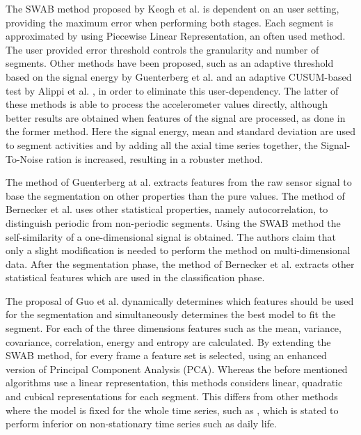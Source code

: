 The SWAB method proposed by Keogh et al. \cite{keogh2001online} is dependent on an user setting, providing the maximum error when performing both stages.
Each segment is approximated by using Piecewise Linear Representation, an often used method.
The user provided error threshold controls the granularity and number of segments.
Other methods have been proposed, such as an adaptive threshold based on the signal energy by Guenterberg et al. \cite{guenterberg2009automatic} and an adaptive CUSUM-based test by Alippi et al. \cite{alippi2006adaptive}, in order to eliminate this user-dependency.
The latter of these methods is able to process the accelerometer values directly, although better results are obtained when features of the signal are processed, as done in the former method.
Here the signal energy, mean and standard deviation are used to segment activities and by adding all the axial time series together, the Signal-To-Noise ration is increased, resulting in a robuster method.

The method of Guenterberg at al. extracts features from the raw sensor signal to base the segmentation on other properties than the pure values.
The method of Bernecker et al. \cite{bernecker2012activity} uses other statistical properties, namely autocorrelation, to distinguish periodic from non-periodic segments.
Using the SWAB method the self-similarity of a one-dimensional signal is obtained.
The authors claim that only a slight modification is needed to perform the method on multi-dimensional data.
After the segmentation phase, the method of Bernecker et al. extracts other statistical features which are used in the classification phase.

The proposal of Guo et al. \cite{guo2012adaptive} dynamically determines which features should be used for the segmentation and simultaneously determines the best model to fit the segment.
For each of the three dimensions features such as the mean, variance, covariance, correlation, energy and entropy are calculated.
By extending the SWAB method, for every frame a feature set is selected, using an enhanced version of Principal Component Analysis (PCA).
Whereas the before mentioned algorithms use a linear representation, this methods considers linear, quadratic and cubical representations for each segment.
This differs from other methods where the model is fixed for the whole time series, such as \cite{fuchs2010online}, which is stated to perform inferior on non-stationary time series such as daily life.

